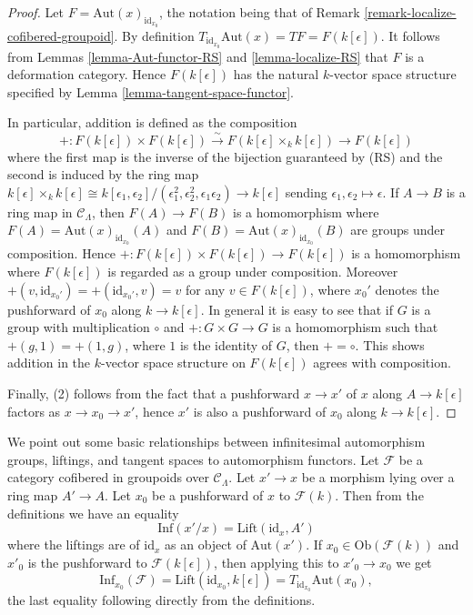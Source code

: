 \begin{proof}
Let $F = \text{Aut}(x)_{\text{id}_{x_0}}$, the notation being that 
of Remark \ref{remark-localize-cofibered-groupoid}. By definition 
$T_{\text{id}_{x_0}} \text{Aut}(x) = TF = F(k[\epsilon])$. It 
follows from Lemmas \ref{lemma-Aut-functor-RS} and \ref{lemma-localize-RS} that 
$F$ is a deformation category.  Hence $F(k[\epsilon])$ has the natural 
$k$-vector space structure specified by Lemma 
\ref{lemma-tangent-space-functor}.  

\medskip \noindent
In particular, addition is defined as the composition
\[ +: F(k[\epsilon]) \times F(k[\epsilon]) \xrightarrow{\sim} 
F(k[\epsilon] \times_{k} k[\epsilon]) \to F(k[\epsilon]) \]
where the first map is the inverse of the bijection guaranteed by (RS) and the 
second is induced by the ring map $k[\epsilon] \times_{k} k[\epsilon] 
\cong k[\epsilon_1,\epsilon_2]/(\epsilon_1^2, \epsilon_2^2, 
\epsilon_1\epsilon_2) \to k[\epsilon]$ sending 
$\epsilon_1,\epsilon_2 \mapsto \epsilon$. If $A \to B$ is a 
ring map in $\mathcal{C}_\Lambda$, then $F(A) \to F(B)$ is a 
homomorphism where $F(A) = \text{Aut}(x)_{\text{id}_{x_0}}(A)$ and 
$F(B) = \text{Aut}(x)_{\text{id}_{x_0}}(B)$ are groups under 
composition.  Hence $+: F(k[\epsilon]) \times F(k[\epsilon])\to 
F(k[\epsilon])$ is a homomorphism where $F(k[\epsilon])$ is regarded as a 
group under composition.  Moreover $+(v, \text{id}_{x_0'}) = 
+(\text{id}_{x_0'},v) = v$ for any $v \in F(k[\epsilon])$, where 
$x_0'$ denotes the pushforward of $x_0$ along $k \to k[\epsilon]$.  
In general it is easy to see that if $G$ is a group with multiplication $\circ$ 
and $+: G \times G \to G$ is a homomorphism such that $+(g,1) = 
+(1,g)$, where $1$ is the identity of $G$, then $+ = \circ$.  This shows 
addition in the $k$-vector space structure on $F(k[\epsilon])$ agrees with 
composition.

\medskip \noindent
Finally, (2) follows from the fact that a pushforward $x \to x'$ of $x$ 
along $A \to k[\epsilon]$ factors as $x \to x_0 \to 
x'$, hence $x'$ is also a pushforward of $x_0$ along $k \to 
k[\epsilon]$.
\end{proof}

\begin{remark}
\label{remark-infaut-lifting-equalities}
We point out some basic relationships between infinitesimal automorphism 
groups, liftings, and tangent spaces to automorphism functors.  Let $\mathcal 
F$ be a category cofibered in groupoids over $\mathcal{C}_\Lambda$.  Let $x' 
\to x$ be a morphism lying over a ring map $A' \to A$.  Let 
$x_0$ be a pushforward of $x$ to $\mathcal{F}(k)$.  Then from the definitions we 
have an equality
\[ \text{Inf}(x'/x) = \text{Lift}(\text{id}_{x}, A') \]
where the liftings are of $\text{id}_{x}$ as an object of 
$\text{Aut}(x')$.  If $x_0 \in \text{Ob}(\mathcal{F}(k))$ and $x'_0$ 
is the pushforward to $\mathcal{F}(k[\epsilon])$, then applying this to $x'_0 
\to x_0$ we get 
\[ \text{Inf}_{x_0}(\mathcal{F}) = 
\text{Lift}(\text{id}_{x_0}, k[\epsilon]) = 
T_{\text{id}_{x_0}} \text{Aut}(x_0), \]
the last equality following directly from the definitions.
\end{remark}

